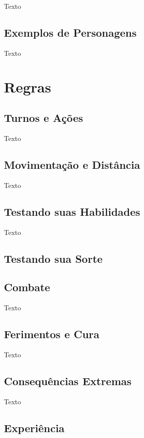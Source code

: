 \documentclass[a4paper, twocolumn, 10pt]{book}
\begin{document}
Texto

\section{Exemplos de Personagens}

Texto

\chapter{Regras} 

\section{Turnos e Ações}

Texto

\section{Movimentação e Distância}

Texto

\section{Testando suas Habilidades}

Texto

\section{Testando sua Sorte}

\section{Combate}

Texto

\section{Ferimentos e Cura}

Texto

\section{Consequências Extremas}

Texto

\section{Experiência}
\end{document}
